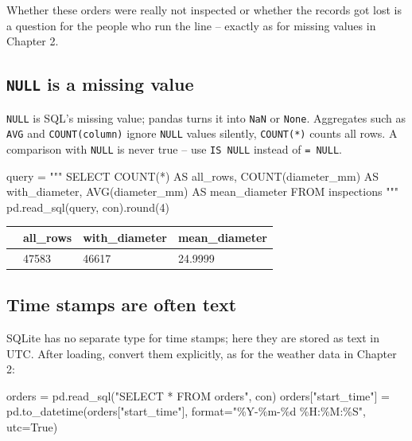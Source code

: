\documentclass[
  letterpaper,
  DIV=11,
  numbers=noendperiod]{scrreprt}
\newenvironment{Shaded}{\begin{snugshade}}{\end{snugshade}}
\newcommand{\BuiltInTok}[1]{\textcolor[rgb]{0.00,0.23,0.31}{#1}}
\newcommand{\DecValTok}[1]{\textcolor[rgb]{0.68,0.00,0.00}{#1}}
\newcommand{\NormalTok}[1]{\textcolor[rgb]{0.00,0.23,0.31}{#1}}
\newcommand{\OperatorTok}[1]{\textcolor[rgb]{0.37,0.37,0.37}{#1}}
\newcommand{\SpecialCharTok}[1]{\textcolor[rgb]{0.37,0.37,0.37}{#1}}
\newcommand{\StringTok}[1]{\textcolor[rgb]{0.13,0.47,0.30}{#1}}
\newcommand{\VariableTok}[1]{\textcolor[rgb]{0.07,0.07,0.07}{#1}}
\begin{document}
Whether these orders were really not inspected or whether the records
got lost is a question for the people who run the line -- exactly as for
missing values in Chapter 2.

\subsection{\texorpdfstring{\texttt{NULL} is a missing
value}{NULL is a missing value}}\label{null-is-a-missing-value}

\texttt{NULL} is SQL's missing value; pandas turns it into \texttt{NaN}
or \texttt{None}. Aggregates such as \texttt{AVG} and
\texttt{COUNT(column)} ignore \texttt{NULL} values silently,
\texttt{COUNT(*)} counts all rows. A comparison with \texttt{NULL} is
never true -- use \texttt{IS\ NULL} instead of \texttt{=\ NULL}.

\begin{Shaded}
\begin{Highlighting}[]
\NormalTok{query }\OperatorTok{=} \StringTok{"""}
\StringTok{SELECT COUNT(*)            AS all\_rows,}
\StringTok{       COUNT(diameter\_mm)  AS with\_diameter,}
\StringTok{       AVG(diameter\_mm)    AS mean\_diameter}
\StringTok{FROM inspections}
\StringTok{"""}
\NormalTok{pd.read\_sql(query, con).}\BuiltInTok{round}\NormalTok{(}\DecValTok{4}\NormalTok{)}
\end{Highlighting}
\end{Shaded}

\begin{longtable}[]{@{}llll@{}}
\toprule\noalign{}
& all\_rows & with\_diameter & mean\_diameter \\
\midrule\noalign{}
\endhead
\bottomrule\noalign{}
\endlastfoot
0 & 47583 & 46617 & 24.9999 \\
\end{longtable}

\subsection{Time stamps are often
text}\label{time-stamps-are-often-text}

SQLite has no separate type for time stamps; here they are stored as
text in UTC. After loading, convert them explicitly, as for the weather
data in Chapter 2:

\begin{Shaded}
\begin{Highlighting}[]
\NormalTok{orders }\OperatorTok{=}\NormalTok{ pd.read\_sql(}\StringTok{"SELECT * FROM orders"}\NormalTok{, con)}
\NormalTok{orders[}\StringTok{"start\_time"}\NormalTok{] }\OperatorTok{=}\NormalTok{ pd.to\_datetime(orders[}\StringTok{"start\_time"}\NormalTok{], }\BuiltInTok{format}\OperatorTok{=}\StringTok{"\%Y{-}\%m{-}}\SpecialCharTok{\%d}\StringTok{ \%H:\%M:\%S"}\NormalTok{, utc}\OperatorTok{=}\VariableTok{True}\NormalTok{)}
\end{Highlighting}
\end{Shaded}
\end{document}
